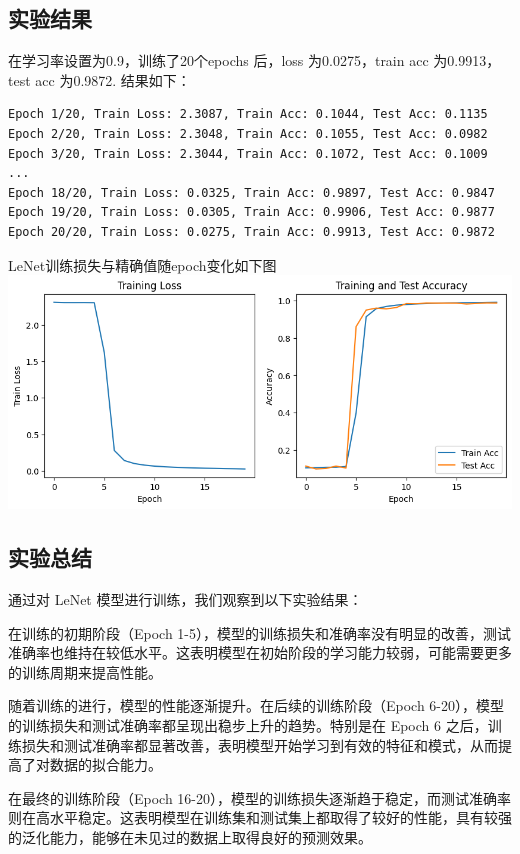 \documentclass[a4paper,12pt]{article}
\begin{document}
\subsection{实验结果}
在学习率设置为0.9，训练了20个epochs 后，loss 为0.0275，train acc 为0.9913，
test acc 为0.9872. 结果如下：
\begin{lstlisting}
Epoch 1/20, Train Loss: 2.3087, Train Acc: 0.1044, Test Acc: 0.1135
Epoch 2/20, Train Loss: 2.3048, Train Acc: 0.1055, Test Acc: 0.0982
Epoch 3/20, Train Loss: 2.3044, Train Acc: 0.1072, Test Acc: 0.1009
...
Epoch 18/20, Train Loss: 0.0325, Train Acc: 0.9897, Test Acc: 0.9847
Epoch 19/20, Train Loss: 0.0305, Train Acc: 0.9906, Test Acc: 0.9877
Epoch 20/20, Train Loss: 0.0275, Train Acc: 0.9913, Test Acc: 0.9872
\end{lstlisting}
LeNet训练损失与精确值随epoch变化如下图
\centering %
\includegraphics[width=0.8\linewidth]{images/lab2_4_loss.png}

\justifying
\subsection{实验总结}
通过对 LeNet 模型进行训练，我们观察到以下实验结果：

在训练的初期阶段（Epoch 1-5），模型的训练损失和准确率没有明显的改善，测试准确率也维持在较低水平。这表明模型在初始阶段的学习能力较弱，可能需要更多的训练周期来提高性能。

随着训练的进行，模型的性能逐渐提升。在后续的训练阶段（Epoch 6-20），模型的训练损失和测试准确率都呈现出稳步上升的趋势。特别是在 Epoch 6 之后，训练损失和测试准确率都显著改善，表明模型开始学习到有效的特征和模式，从而提高了对数据的拟合能力。

在最终的训练阶段（Epoch 16-20），模型的训练损失逐渐趋于稳定，而测试准确率则在高水平稳定。这表明模型在训练集和测试集上都取得了较好的性能，具有较强的泛化能力，能够在未见过的数据上取得良好的预测效果。
\end{document}
